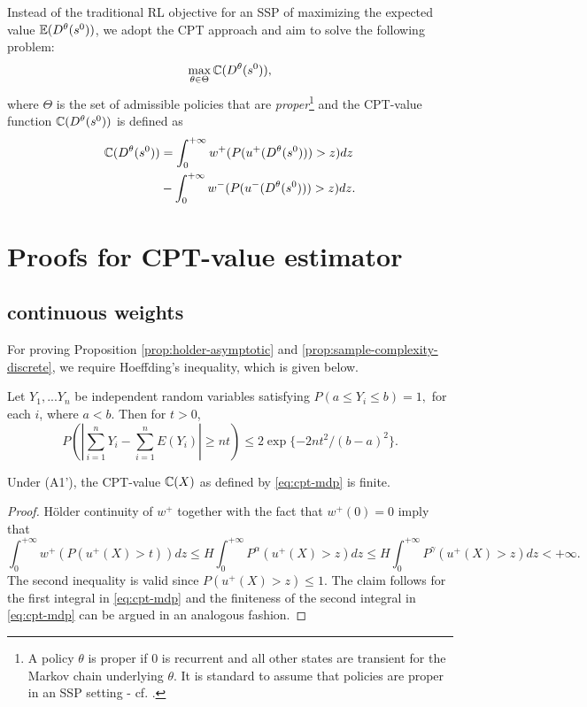 Instead of the traditional RL objective for an SSP of maximizing the expected value $\mathbb{E} (D^\theta(s^0))$, 
we adopt the CPT approach and aim to solve the following problem: 
$$ \max_{\theta \in \Theta} \mathbb{C}(D^\theta(s^0)),$$
where $\Theta$ is the set of admissible policies that are \textit{proper}\footnote{A policy $\theta$ is proper if $0$ is recurrent and all other states are transient for the Markov chain underlying $\theta$. It is standard to assume that policies are proper in an SSP setting - cf. \cite{bertsekas1995dynamic}.} and the CPT-value function $\mathbb{C}(D^\theta(s^0))$ is defined as
\begin{align}
\mathbb{C}(D^\theta(s^0))& = \int_0^{+\infty} w^+(P(u^+(D^\theta(s^0)))>z) dz \nonumber
\\&- \int_0^{+\infty} w^-(P(u^-(D^\theta(s^0)))>z) dz. \label{eq:cpt-mdp}
\end{align}


\section{Proofs for CPT-value estimator}
\label{appendix:cpt-est}

\subsection{\holder continuous weights}
\label{sec:holder-proofs}
For proving Proposition \ref{prop:holder-asymptotic} and \ref{prop:sample-complexity-discrete}, we require Hoeffding's inequality, which is given below.
\begin{lemma}
Let $Y_1,...Y_n$ be independent random variables satisfying $P(a\leq Y_i \leq b)= 1,$ for each $i$, where $a<b.
$ Then for $t>0$,
$$P(\left|\sum_{i=1}^n Y_i -\sum_{i=1}^n E(Y_i)\right| \geq nt ) \leq 2\exp{\{-2nt^2 /(b-a)^2\}}. $$
\end{lemma}

\begin{proposition}
\label{prop:Holder-cpt-finite}
Under (A1'), the CPT-value $\mathbb{C}(X)$ as defined by \eqref{eq:cpt-mdp} is finite. 
\end{proposition}
\begin{proof}

H\"{o}lder continuity of $w^+$ together with the fact that $w^+(0)=0$ imply that 
$$
\int_0^{+\infty} w^+(P(u^{+}(X)>t)) dz 
\le H \int_0^{+\infty} P^{\alpha} (u^+(X)>z) dz
\le H \int_0^{+\infty} P^{\gamma} (u^+(X)>z) dz 
<+\infty.
$$
The second inequality is valid since $P(u^+(X)>z) \leq 1$. The claim follows for the first integral in \eqref{eq:cpt-mdp} and the finiteness of the second integral in \eqref{eq:cpt-mdp} can be argued in an analogous fashion.
\end{proof}


